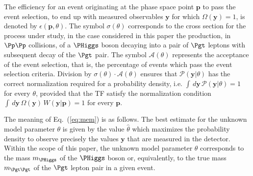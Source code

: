 The efficiency for an event originating at the phase space point
$\bm{p}$ to pass the event selection, \ie to end up with measured
observables $\bm{y}$ for which $\Omega(\bm{y}) = 1$,
is denoted by $\epsilon(\bm{p},\theta)$. 
The symbol $\sigma(\theta)$ corresponds to the cross section for the process under study,
in the case considered in this paper the production, in $\Pp\Pp$
collisions, of a $\PHiggs$ boson decaying into a pair of $\Pgt$ leptons
with subsequent decay of the $\Pgt$ pair.
The symbol $\mathcal{A}(\theta)$ represents the acceptance of the
event selection, that is, the percentage of events which pass the event
selection criteria.
Division by $\sigma(\theta) \cdot \mathcal{A}(\theta)$ ensures that $\mathcal{P}(\bm{y}|\theta)$ has
the correct normalization required for a probability density, 
i.e. $\int \, d\bm{y} \, \mathcal{P}(\bm{y}|\theta) = 1$ for every $\theta$, 
provided that the TF satisfy the normalization condition
$\int \, d\bm{y} \, \Omega(\bm{y}) \, W(\bm{y}|\bm{p}) = 1$
for every $\bm{p}$.

The meaning of Eq.~(\ref{eq:mem}) is as follows.
The best estimate for the unknown model parameter $\theta$ is given by the
value $\hat{\theta}$ which maximizes the probability density to observe precisely the 
values $\bm{y}$ that are measured in the detector. 
Within the scope of this paper, the unknown model parameter $\theta$
corresponds to the mass $m_{\PHiggs}$ of the $\PHiggs$ boson or,
equivalently, to the true mass $m_{\Pgt\Pgt}$ of the $\Pgt$ lepton
pair in a given event.


